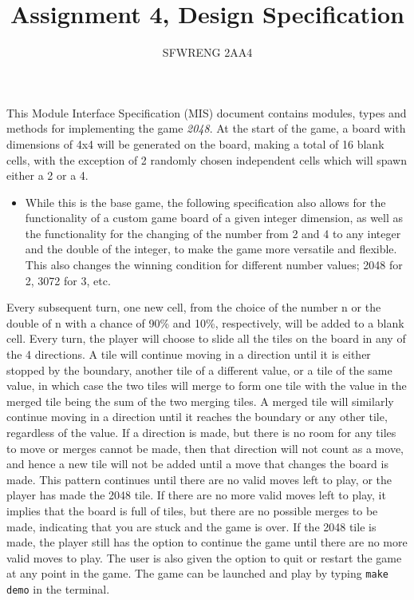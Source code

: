 \documentclass[12pt]{article}
\title{Assignment 4, Design Specification}
\author{SFWRENG 2AA4}
\begin{document}
\maketitle
This Module Interface Specification (MIS) document contains modules, types and
methods for implementing the game \textit{2048}. At the start of the game, a board with dimensions of 4x4 will be generated on the board, making a total of 16 blank cells, with the exception of 2 randomly chosen independent cells which will spawn either a 2 or a 4.
\begin{itemize}
    \item While this is the base game, the following specification also allows for the functionality of a custom game board of a given integer dimension, as well as the functionality for the changing of the number from 2 and 4 to any integer and the double of the integer, to make the game more versatile and flexible. This also changes the winning condition for different number values; 2048 for 2, 3072 for 3, etc.
\end{itemize}
Every subsequent turn, one new cell, from the choice of the number n or the double of n with a chance of 90\% and 10\%, respectively, will be added to a blank cell. Every turn, the player will choose to slide all the tiles on the board in any of the 4 directions. A tile will continue moving in a direction until it is either stopped by the boundary, another tile of a different value, or a tile of the same value, in which case the two tiles will merge to form one tile with the value in the merged tile being the sum of the two merging tiles. A merged tile will similarly continue moving in a direction until it reaches the boundary or any other tile, regardless of the value. If a direction is made, but there is no room for any tiles to move or merges cannot be made, then that direction will not count as a move, and hence a new tile will not be added until a move that changes the board is made. This pattern continues until there are no valid moves left to play, or the player has made the 2048 tile. If there are no more valid moves left to play, it implies that the board is full of tiles, but there are no possible merges to be made, indicating that you are stuck and the game is over. If the 2048 tile is made, the player still has the option to continue the game until there are no more valid moves to play. The user is also given the option to quit or restart the game at any point in the game. The game can be launched and play by typing \texttt{make demo} in the terminal.
\end{document}
